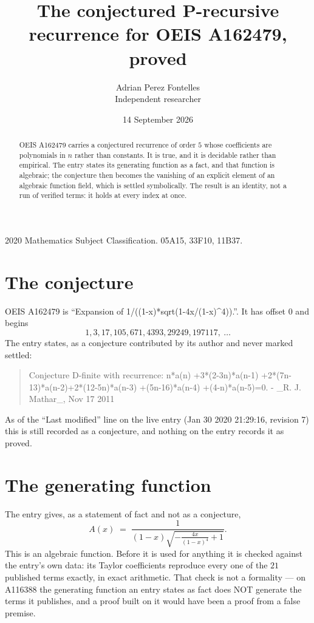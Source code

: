 \documentclass[11pt,a4paper]{article}
\title{The conjectured P-recursive recurrence for OEIS A162479, proved}
\author{Adrian Perez Fontelles\\ \small Independent researcher}
\date{14 September 2026}
\theoremstyle{plain}
\theoremstyle{definition}
\begin{document}
\maketitle

\begin{abstract}
OEIS A162479 carries a conjectured recurrence of order $5$ whose coefficients are polynomials in
$n$ rather than constants. It is true, and it is decidable rather than empirical. The entry
states its generating function as a fact, and that function is algebraic; the conjecture then
becomes the vanishing of an explicit element of an algebraic function field, which is settled
symbolically. The result is an identity, not a run of verified terms: it holds at every index
at once.
\end{abstract}

\noindent\small 2020 Mathematics Subject Classification. 05A15, 33F10, 11B37.\normalsize

\section{The conjecture}

OEIS A162479 is ``Expansion of 1/((1-x)*sqrt(1-4x/(1-x)\^{}4)).''. It has offset $0$ and begins
\[
1, 3, 17, 105, 671, 4393, 29249, 197117,\ \dots
\]
The entry states, as a conjecture contributed by its author and never marked settled:
\begin{quote}\raggedright\small
Conjecture D-finite with recurrence: n*a(n) +3*(2-3n)*a(n-1) +2*(7n-13)*a(n-2)+2*(12-5n)*a(n-3) +(5n-16)*a(n-4) +(4-n)*a(n-5)=0. - \_R. J. Mathar\_, Nov 17 2011
\end{quote}
As of the ``Last modified'' line on the live entry (Jan 30 2020 21:29:16, revision 7)
this is still recorded as a conjecture, and nothing on the entry records it as proved.

\section{The generating function}

The entry gives, as a statement of fact and not as a conjecture,
\[
A(x)\;=\;\frac{1}{\left(1 - x\right) \sqrt{- \frac{4 x}{\left(1 - x\right)^{4}} + 1}} .
\]
This is an algebraic function. Before it is used for anything it is checked against the entry's
own data: its Taylor coefficients reproduce every one of the $21$ published terms
exactly, in exact arithmetic. That check is not a formality --- on A116388 the generating
function an entry states as fact does NOT generate the terms it publishes, and a proof built on
it would have been a proof from a false premise.
\end{document}
